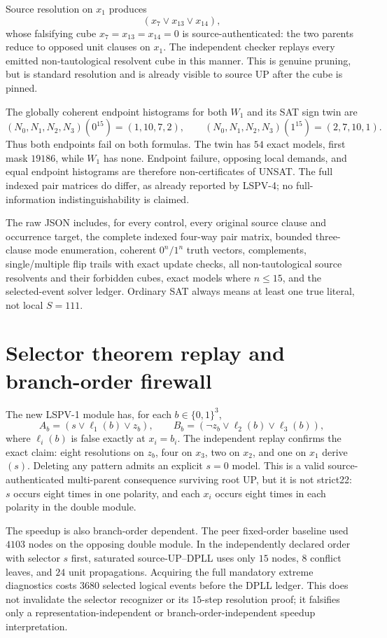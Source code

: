 \documentclass[10pt]{article}
\begin{document}
Source resolution on $x_1$ produces
\[
 (x_7\vee x_{13}\vee x_{14}), \tag{2}
\]
whose falsifying cube $x_7=x_{13}=x_{14}=0$ is source-authenticated: the two
parents reduce to opposed unit clauses on $x_1$.  The independent checker
replays every emitted non-tautological resolvent cube in this manner.  This is
genuine pruning, but is standard resolution and is already visible to source
UP after the cube is pinned.

The globally coherent endpoint histograms for both $W_1$ and its SAT sign twin
are
\[
 (N_0,N_1,N_2,N_3)(0^{15})=(1,10,7,2),\qquad
 (N_0,N_1,N_2,N_3)(1^{15})=(2,7,10,1).
\]
Thus both endpoints fail on both formulas.  The twin has $54$ exact models,
first mask $19186$, while $W_1$ has none.  Endpoint failure, opposing local
demands, and equal endpoint histograms are therefore non-certificates of
UNSAT.  The full indexed pair matrices do differ, as already reported by
LSPV-4; no full-information indistinguishability is claimed.

The raw JSON includes, for every control, every original source clause and
occurrence target, the complete indexed four-way pair matrix, bounded
three-clause mode enumeration, coherent $0^n/1^n$ truth vectors, complements,
single/multiple flip trails with exact update checks, all non-tautological
source resolvents and their forbidden cubes, exact models where $n\le15$, and
the selected-event solver ledger.  Ordinary SAT always means at least one true
literal, not local $S=111$.

\section{Selector theorem replay and branch-order firewall}
The new LSPV-1 module has, for each $b\in\{0,1\}^3$,
\[
 A_b=(s\vee\ell_1(b)\vee z_b),\qquad
 B_b=(\neg z_b\vee\ell_2(b)\vee\ell_3(b)),
\]
where $\ell_i(b)$ is false exactly at $x_i=b_i$.  The independent replay
confirms the exact claim: eight resolutions on $z_b$, four on $x_3$, two on
$x_2$, and one on $x_1$ derive $(s)$.  Deleting any pattern admits an explicit
$s=0$ model.  This is a valid source-authenticated multi-parent consequence
surviving root UP, but it is not strict22: $s$ occurs eight times in one
polarity, and each $x_i$ occurs eight times in each polarity in the double
module.

The speedup is also branch-order dependent.  The peer fixed-order baseline
used $4103$ nodes on the opposing double module.  In the independently declared
order with selector $s$ first, saturated source-UP--DPLL uses only $15$ nodes,
$8$ conflict leaves, and $24$ unit propagations.  Acquiring the full mandatory
extreme diagnostics costs $3680$ selected logical events before the DPLL
ledger.  This does not invalidate the selector recognizer or its $15$-step
resolution proof; it falsifies only a representation-independent or
branch-order-independent speedup interpretation.
\end{document}
